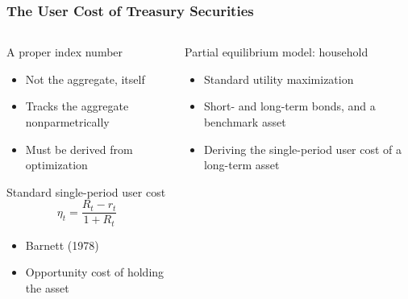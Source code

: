 \documentclass[11pt, handout, aspectratio=169]{beamer}
\newenvironment{wideitemize}{\itemize\addtolength{\itemsep}{10pt}}{\enditemize}
\begin{document}
\begin{frame}
\frametitle{The User Cost of Treasury Securities}
\label{slide:UserCost}
\begin{columns}[t]
	\begin{column}{0.49\textwidth}
		\begin{wideitemize}
			\item A proper index number
			\begin{itemize}
				\item Not the aggregate, itself
				\item Tracks the aggregate nonparmetrically
				\item Must be derived from optimization 
			\end{itemize}
			\item Standard single-period user cost
				$$\eta_t = \frac{R_t-r_t}{1+R_t}$$
			\begin{itemize}
				\item Barnett (1978)
				\item Opportunity cost of holding the asset
			\end{itemize}
		\end{wideitemize}	
	\end{column}
	\hfill
	\begin{column}{0.49\textwidth}
		\begin{wideitemize}
			\item Partial equilibrium model: household
			\begin{itemize}
				\item Standard utility maximization
				\item Short- and long-term bonds, and a benchmark asset
			\end{itemize}
			\item {\bf \color{WeberPurple}{Contribution}}
			\begin{itemize}
				\item Deriving the single-period user cost of a long-term asset
			\end{itemize}
		\end{wideitemize}
	\end{column}
\end{columns}
	\vfill
	\hfill \hyperlink{slide:Utility}{}
\end{frame}
\end{document}
